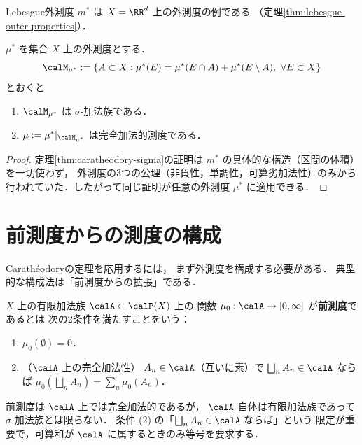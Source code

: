 \begin{remark}
Lebesgue外測度 $m^*$ は
$X = \RR^d$ 上の外測度の例である
（定理\ref{thm:lebesgue-outer-properties}）．
\end{remark}

\begin{theorem}\label{thm:caratheodory-general}
$\mu^*$ を集合 $X$ 上の外測度とする．
\[
\calM_{\mu^*} :=
\{A \subset X : \mu^*(E) = \mu^*(E \cap A) + \mu^*(E \setminus A),\ \forall E \subset X\}
\]
とおくと
\begin{enumerate}
\item $\calM_{\mu^*}$ は $\sigma$-加法族である．
\item $\mu := \mu^*|_{\calM_{\mu^*}}$ は完全加法的測度である．
\end{enumerate}
\end{theorem}
\begin{proof}
定理\ref{thm:caratheodory-sigma}の証明は
$m^*$ の具体的な構造（区間の体積）を一切使わず，
外測度の3つの公理（非負性，単調性，可算劣加法性）のみから
行われていた．したがって同じ証明が任意の外測度 $\mu^*$ に適用できる．
\end{proof}

\section{前測度からの測度の構成}\label{sec:premeasure}

Carath\'eodoryの定理を応用するには，
まず外測度を構成する必要がある．
典型的な構成法は「前測度からの拡張」である．

\begin{definition}[前測度]\label{def:premeasure}
$X$ 上の有限加法族 $\calA \subset \calP(X)$ 上の
関数 $\mu_0 : \calA \to [0,\infty]$ が\textbf{前測度}であるとは
次の2条件を満たすことをいう：
\begin{enumerate}
\item $\mu_0(\emptyset) = 0$．
\item （$\calA$ 上の完全加法性）
$A_n \in \calA$（互いに素）で
$\bigsqcup_n A_n \in \calA$ ならば
$\mu_0(\bigsqcup_n A_n) = \sum_n \mu_0(A_n)$．
\end{enumerate}
\end{definition}

\begin{remark}
前測度は $\calA$ 上では完全加法的であるが，
$\calA$ 自体は有限加法族であって $\sigma$-加法族とは限らない．
条件 (2) の「$\bigsqcup_n A_n \in \calA$ ならば」という
限定が重要で，可算和が $\calA$ に属するときのみ等号を要求する．
\end{remark}

